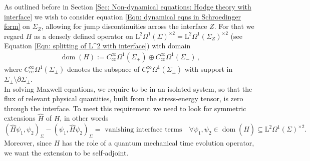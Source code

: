 As outlined before in Section \ref{Sec: Non-dynamical equations: Hodge theory with interface} we wish to consider equation \eqref{Eqn: dynamical eqns in Schroedinger form} on $\Sigma_Z$, allowing for jump discontinuities across the interface $Z$. For that we regard $H$ as a densely defined operator on $\mathrm{L}^2\Omega^1(\Sigma)^{\times 2}=\mathrm{L}^2\Omega^1(\Sigma_Z)^{\times 2}$ (see Equation \eqref{Eqn: splitting of L^2 with interface}) with domain
\begin{align}\label{Eqn: curl-Hamiltonian domain}
	\operatorname{dom}(H):=
	C^\infty_{\mathrm{cc}}\Omega^1(\Sigma_+)\oplus C^\infty_{\mathrm{cc}}\Omega^1(\Sigma_-)\,,
\end{align}
where $C^\infty_{\mathrm{cc}}\Omega^1(\Sigma_\pm)$ denotes the subspace of $C^\infty_{\mathrm{c}}\Omega^1(\Sigma_\pm)$ with support in $\Sigma_\pm\setminus\partial\Sigma_\pm$.\\

In solving Maxwell equations, we require to be in an isolated system, so that the flux of relevant physical quantities, built from the stress-energy tensor, is zero through the interface. To meet this requirement we need to look for symmetric extensions $\widehat{H}$ of $H$, in other words
\begin{equation}
(\widehat{H}\psi_1,\psi_2)_\Sigma-(\psi_1,\widehat{H}\psi_2)_\Sigma=\text{ vanishing interface terms}\quad \forall \psi_1,\psi_2\in\operatorname{dom}(\widehat{H})\subseteq\mathrm{L}^2\Omega^1(\Sigma)^{\times 2}.
\end{equation}
Moreover, since $H$ has the role of a quantum mechanical time evolution operator, we want the extension to be self-adjoint.


